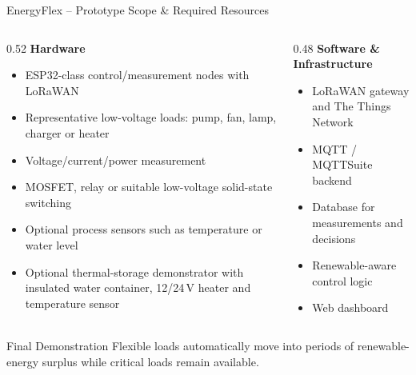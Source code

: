 \begin{frame}{EnergyFlex -- Prototype Scope \& Required Resources}
\small
\begin{columns}[T,onlytextwidth]
    \begin{column}{0.52\textwidth}
        \textbf{Hardware}
        \begin{itemize}
            \item ESP32-class control/measurement nodes with LoRaWAN
            \item Representative low-voltage loads: pump, fan, lamp, charger or heater
            \item Voltage/current/power measurement
            \item MOSFET, relay or suitable low-voltage solid-state switching
            \item Optional process sensors such as temperature or water level
            \item Optional thermal-storage demonstrator with insulated water container, 12/24\,V heater and temperature sensor
        \end{itemize}
    \end{column}
    \begin{column}{0.48\textwidth}
        \textbf{Software \& Infrastructure}
        \begin{itemize}
            \item LoRaWAN gateway and The Things Network
            \item MQTT / MQTTSuite backend
            \item Database for measurements and decisions
            \item Renewable-aware control logic
            \item Web dashboard
        \end{itemize}
    \end{column}
\end{columns}

\begin{block}{Final Demonstration}
Flexible loads automatically move into periods of renewable-energy surplus while critical loads remain available.
\end{block}
\end{frame}
